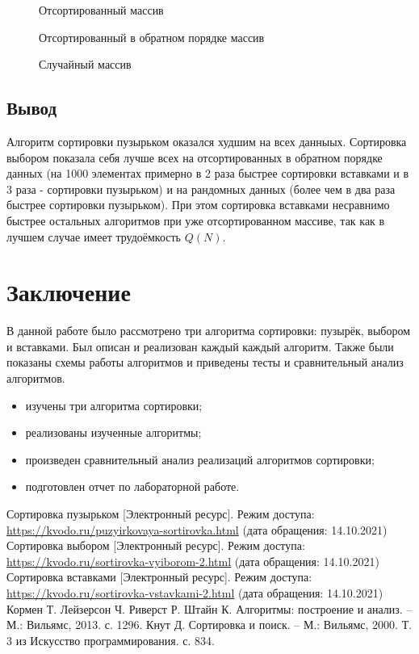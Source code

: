 \documentclass[a4paper,14pt, unknownkeysallowed]{extreport}
\newcommand{\img}[3] {
	\begin{figure}[h!]
		\center{\texttt{[image: img/\#2]}}
		\caption{#3}
		\label{img:#2}
	\end{figure}
}
\begin{document}
\img{130mm}{graph_sorted}{Отсортированный массив}
\clearpage
\img{130mm}{graph_sorted_back}{Отсортированный в обратном порядке массив}
\clearpage
\img{130mm}{graph_random}{Случайный массив}

\clearpage

\section{Вывод}

Алгоритм сортировки пузырьком оказался худшим на всех данныых. Сортировка выбором показала себя лучше всех на отсортированных в обратном порядке данных (на 1000 элементах примерно в 2 раза быстрее сортировки вставками и в 3 раза - сортировки пузырьком) и на рандомных данных (более чем в два раза быстрее сортировки пузырьком). При этом сортировка вставками несравнимо быстрее остальных алгоритмов при уже отсортированном массиве, так как в лучшем случае имеет трудоёмкость $Q(N)$.





\chapter*{Заключение}

В данной работе было рассмотрено три алгоритма сортировки: пузырёк, выбором и вставками. Был описан и реализован каждый каждый алгоритм. Также были показаны схемы работы алгоритмов и приведены тесты и сравнительный анализ алгоритмов.

\begin{itemize}
	\item изучены три алгоритма сортировки;
	\item реализованы изученные алгоритмы;
    \item произведен сравнительный анализ реализаций алгоритмов сортировки;
	\item подготовлен отчет по лабораторной работе.
\end{itemize}





\begin{thebibliography}{3}
Сортировка пузырьком  [Электронный ресурс]. Режим доступа: \url{https://kvodo.ru/puzyirkovaya-sortirovka.html} (дата обращения: 14.10.2021)
Сортировка выбором  [Электронный ресурс]. Режим доступа: \url{https://kvodo.ru/sortirovka-vyiborom-2.html} (дата обращения: 14.10.2021)
Сортировка вставками  [Электронный ресурс]. Режим доступа: \url{https://kvodo.ru/sortirovka-vstavkami-2.html} (дата обращения: 14.10.2021)
Кормен Т. Лейзерсон Ч. Риверст Р. Штайн К. Алгоритмы: построение и анализ. -- М.: Вильямс, 2013. с. 1296.
Кнут Д. Сортировка и поиск. -- М.: Вильямс, 2000. Т. 3 из Искусство программирования. с. 834.
\end{thebibliography}
\end{document}
